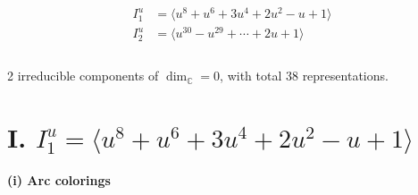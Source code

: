 \documentclass[1p]{elsarticle_modified}
\theoremstyle{definition}
\begin{document}
\begin{align*}
I^u_{1}&=\langle 
u^8+u^6+3 u^4+2 u^2- u+1\rangle \\
I^u_{2}&=\langle 
u^{30}- u^{29}+\cdots+2 u+1\rangle \\
\\
\end{align*}
\raggedright * 2 irreducible components of $\dim_{\mathbb{C}}=0$, with total 38 representations.\\
\newpage
\renewcommand{\arraystretch}{1}
\centering \section*{I. $I^u_{1}= \langle u^8+u^6+3 u^4+2 u^2- u+1 \rangle$}
\flushleft \textbf{(i) Arc colorings}\\
\end{document}
